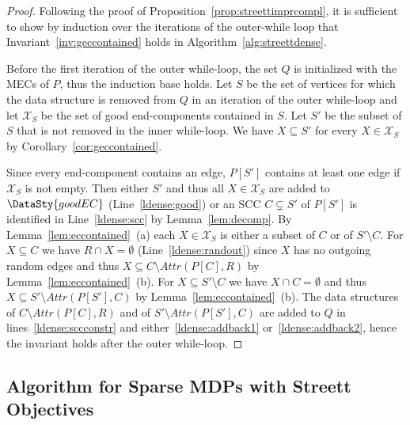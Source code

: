 \documentclass[11pt,letterpaper]{article}
\newcommand{\lu}{\textup{(}}
\newcommand{\ru}{\textup{)}\xspace}
\newcommand{\upbr}[1]{\lu #1\ru}
\newcommand{\at}{\mathit{Attr}}
\newcommand{\mdp}{P\xspace}
\newcommand{\ec}{X\xspace}
\newcommand{\scc}{C\xspace}
\newcommand{\good}{\DataSty{goodEC}}
\begin{document}
\begin{proof}
	Following the proof of Proposition~\ref{prop:streettimprcompl}, it is sufficient
	to show by induction over the iterations of the outer-while loop that Invariant~\ref{inv:geccontained} holds in Algorithm~\ref{alg:streettdense}. 
	
	Before the first iteration of the outer while-loop, the 
	set $Q$ is initialized with the MECs of $\mdp$, thus the induction base holds.
	Let $S$ be the set of vertices for which the data structure is 
	removed from $Q$ in an iteration of the outer while-loop and 
	let $\mathcal{\ec}_S$ be the set of good end-components 
	contained in $S$. 
	Let $S'$ be the subset of $S$ that is not removed in the inner while-loop.
	We have $\ec \subseteq S'$ for every $\ec \in \mathcal{\ec}_S$ by
	Corollary~\ref{cor:geccontained}.
	
	Since every end-component contains an edge, $\mdp[S']$ contains at least one
	edge if $\mathcal{\ec}_S$ is not empty. 
	Then either $S'$ and thus all $\ec \in \mathcal{\ec}_S$ are added to $\good$
	(Line~\ref{ldense:good}) or an SCC $\scc \subsetneq S'$ of $\mdp[S']$ is 
	identified in Line~\ref{ldense:scc} by Lemma~\ref{lem:decomp}. By 
	Lemma~\ref{lem:eccontained}~\upbr{a} each $\ec \in \mathcal{\ec}_S$ is either
	a subset of $\scc$ or of $S' \setminus \scc$.
	For $\ec \subseteq \scc$ we have $R \cap \ec = \emptyset$ (Line~\ref{ldense:randout})
	since $\ec$ has no outgoing random edges and thus $\ec \subseteq \scc \setminus 
	\at(\mdp[\scc],R)$ by Lemma~\ref{lem:eccontained}~\upbr{b}.
	For $\ec \subseteq S' \setminus \scc$ we have $\ec \cap \scc = \emptyset$
	and thus $\ec \subseteq S' \setminus \at(\mdp[S'],\scc)$
	by Lemma~\ref{lem:eccontained}~\upbr{b}.	
	The data structures of $\scc \setminus \at(\mdp[\scc],R)$
	and of $S' \setminus \at(\mdp[S'],\scc)$
	are added to $Q$ in lines~\ref{ldense:sccconstr} and either~\ref{ldense:addback1}
	or~\ref{ldense:addback2}, hence the invariant holds after the outer while-loop.
\end{proof}

\subsection{Algorithm for Sparse MDPs with Streett Objectives}\label{sec:streettsparse}
\end{document}
